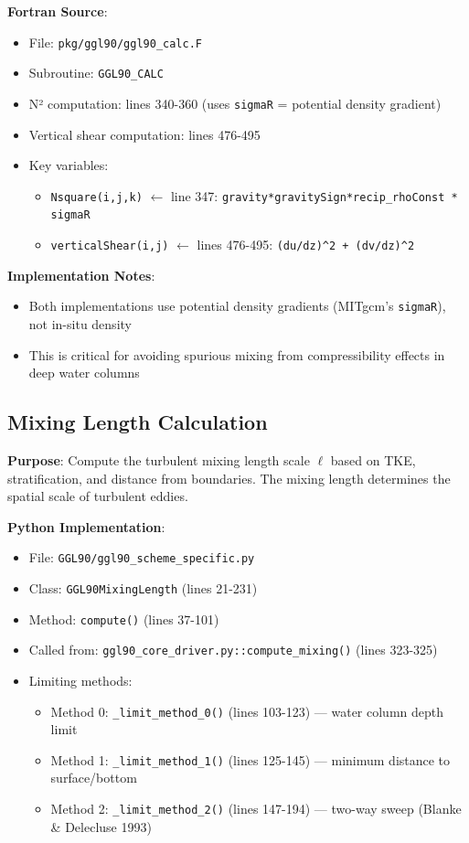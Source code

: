 \documentclass[11pt]{article}
\begin{document}
\textbf{Fortran Source}:
\begin{itemize}
    \item File: \verb|pkg/ggl90/ggl90_calc.F|
    \item Subroutine: \verb|GGL90_CALC|
    \item N² computation: lines 340-360 (uses \verb|sigmaR| = potential density gradient)
    \item Vertical shear computation: lines 476-495
    \item Key variables:
        \begin{itemize}
            \item \verb|Nsquare(i,j,k)| $\leftarrow$ line 347: \verb|gravity*gravitySign*recip_rhoConst * sigmaR|
            \item \verb|verticalShear(i,j)| $\leftarrow$ lines 476-495: \verb|(du/dz)^2 + (dv/dz)^2|
        \end{itemize}
\end{itemize}

\textbf{Implementation Notes}:
\begin{itemize}
    \item Both implementations use potential density gradients (MITgcm's \verb|sigmaR|), not in-situ density
    \item This is critical for avoiding spurious mixing from compressibility effects in deep water columns
\end{itemize}

\subsection{Mixing Length Calculation}

\textbf{Purpose}: Compute the turbulent mixing length scale $\ell$ based on TKE, stratification, and distance from boundaries. The mixing length determines the spatial scale of turbulent eddies.

\textbf{Python Implementation}:
\begin{itemize}
    \item File: \verb|GGL90/ggl90_scheme_specific.py|
    \item Class: \verb|GGL90MixingLength| (lines 21-231)
    \item Method: \verb|compute()| (lines 37-101)
    \item Called from: \verb|ggl90_core_driver.py::compute_mixing()| (lines 323-325)
    \item Limiting methods:
        \begin{itemize}
            \item Method 0: \verb|_limit_method_0()| (lines 103-123) — water column depth limit
            \item Method 1: \verb|_limit_method_1()| (lines 125-145) — minimum distance to surface/bottom
            \item Method 2: \verb|_limit_method_2()| (lines 147-194) — two-way sweep (Blanke \& Delecluse 1993)
        \end{itemize}
\end{itemize}
\end{document}
